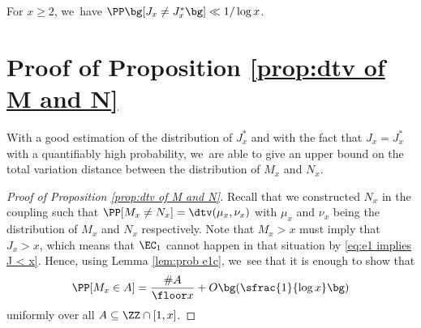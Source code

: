 \begin{prop}
\label{prop:prob J neq J*}
For $x\ge2$, we~have $\PP\bg[J_x \ne J_x^*\bg] \ll 1/\log x$.
\end{prop}

\section{Proof of Proposition \ref{prop:dtv of M and N}}
\label{sec:dtv}

With a good estimation of the distribution of $J_x^*$ and with the fact that $J_x = J_x^*$ with a quantifiably high probability, we~are able to give an upper bound on the total variation distance between the distribution of $M_x$ and $N_x$.

\begin{proof}[Proof of Proposition \ref{prop:dtv of M and N}]
Recall that we constructed $N_x$ in the coupling such that $\PP[M_x \ne N_x] = \dtv(\mu_x, \nu_x)$ with $\mu_x$ and $\nu_x$ being the distribution of $M_x$ and $N_x$ respectively. Note that $M_x > x$ must imply that $J_x > x$, which means that $\EC_1$ cannot happen in that situation by \eqref{eq:e1 implies J < x}. Hence, using Lemma \ref{lem:prob e1c}, we~see that it is enough to show that
\[
\PP[M_x \in A] = \frac{\# A}{\floor x} + O\bg(\sfrac{1}{\log x}\bg)
\]
uniformly over all $A \subseteq \ZZ \cap [1, x]$.


\end{proof}
